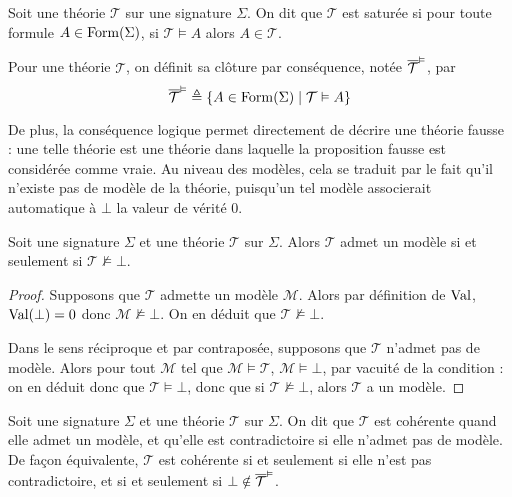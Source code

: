 \begin{definition}
  Soit une théorie $\mathcal T$ sur une signature $\Sigma$. On dit que
  $\mathcal T$ est saturée si pour toute formule $A\in\operatorname{Form}(\Sigma)$,
  si $\mathcal T\vDash A$ alors $A\in \mathcal T$.

  Pour une théorie $\mathcal T$, on définit sa clôture par conséquence, notée
  $\overline{\mathcal T}^{\vDash}$, par
  \[\overline{\mathcal T}^{\vDash} \triangleq \{ A \in \operatorname{Form}(\Sigma)
  \mid \mathcal T \vDash A\}\]
\end{definition}

De plus, la conséquence logique permet directement de décrire une théorie
\og fausse\fg{} : une telle théorie est une théorie dans laquelle la proposition
fausse est considérée comme vraie. Au niveau des modèles, cela se traduit par le
fait qu'il n'existe pas de modèle de la théorie, puisqu'un tel modèle associerait
automatique à $\bot$ la valeur de vérité $0$.

\begin{proposition}
  Soit une signature $\Sigma$ et une théorie $\mathcal T$ sur $\Sigma$. Alors
  $\mathcal T$ admet un modèle si et seulement si $\mathcal T \not\vDash \bot$.
\end{proposition}

\begin{proof}
  Supposons que $\mathcal T$ admette un modèle $\mathcal M$. Alors par définition
  de $\operatorname{Val}$, $\operatorname{Val}(\bot) = 0$ donc $\mathcal M\not\models \bot$. On en déduit
  que $\mathcal T\not\vDash\bot$.

  Dans le sens réciproque et par contraposée, supposons que $\mathcal T$ n'admet
  pas de modèle. Alors pour tout $\mathcal M$ tel que
  $\mathcal M\models \mathcal T$, $\mathcal M\models \bot$, par vacuité de la
  condition : on en déduit donc que $\mathcal T \vDash \bot$, donc que si
  $\mathcal T \not\vDash\bot$, alors $\mathcal T$ a un modèle.
\end{proof}

\begin{definition}
  Soit une signature $\Sigma$ et une théorie $\mathcal T$ sur $\Sigma$. On dit
  que $\mathcal T$ est cohérente quand elle admet un modèle, et qu'elle est
  contradictoire si elle n'admet pas de modèle. De façon équivalente,
  $\mathcal T$ est cohérente si et seulement si elle n'est pas contradictoire,
  et si et seulement si $\bot\notin\overline{\mathcal T}^{\vDash}$.
\end{definition}

